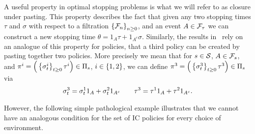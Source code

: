 A useful property in optimal stopping problems is what we will refer to as closure under pasting. This property
describes the fact that given any two stopping times $\tau$ and $\sigma$ with respect to a filtration $\left\{\mathcal{F}_n\right\}_{n\geq 0}$,
and an event $A\in\mathcal{F}_\tau$ we can construct a new stopping time $\theta=1_A \tau+1_{A^c}\sigma$. Similarly,
the results in~\citet{mandelbaum1981optimal} rely on an analogue of this property for policies, that a third policy can be created
by pasting together two policies. More precisely we mean that for 
$s\in\mathcal{S}$, 
$A\in\mathcal{F}_{s}$,
and 
\(
    \pi^i
    =
    \Big( 
        \left\{
            \sigma_{t}^i
        \right\}_{t\geq 0}
        \tau^i
    \Big)
    \in\Pi_{s}
\),
$i\in\left\{1,2\right\}$,
we can define 
\(
    \pi^3
    =
    \Big( 
        \left\{
            \sigma_{t}^3
        \right\}_{t\geq 0}
        \tau^3
    \Big)
    \in\Pi_{s}
\)
via
\[
    \sigma_{t}^3
    =
    \sigma_{t}^1 1_A
    +
    \sigma_{t}^2 1_{A^c}
    \qquad
    \tau^3
    =
    \tau^1 1_A
    +
    \tau^2 1_{A^c} .
\]

However, the following simple pathological example illustrates that we cannot have an analogous condition for the set
of IC policies for every choice of environment.

